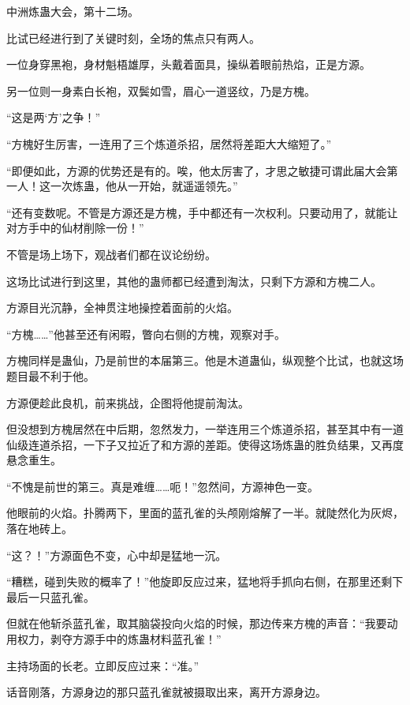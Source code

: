 
\begin{this_body}



中洲炼蛊大会，第十二场。

比试已经进行到了关键时刻，全场的焦点只有两人。

一位身穿黑袍，身材魁梧雄厚，头戴着面具，操纵着眼前热焰，正是方源。

另一位则一身素白长袍，双鬓如雪，眉心一道竖纹，乃是方槐。

“这是两‘方’之争！”

“方槐好生厉害，一连用了三个炼道杀招，居然将差距大大缩短了。”

“即便如此，方源的优势还是有的。唉，他太厉害了，才思之敏捷可谓此届大会第一人！这一次炼蛊，他从一开始，就遥遥领先。”

“还有变数呢。不管是方源还是方槐，手中都还有一次权利。只要动用了，就能让对方手中的仙材削除一份！”

不管是场上场下，观战者们都在议论纷纷。

这场比试进行到这里，其他的蛊师都已经遭到淘汰，只剩下方源和方槐二人。

方源目光沉静，全神贯注地操控着面前的火焰。

“方槐……”他甚至还有闲暇，瞥向右侧的方槐，观察对手。

方槐同样是蛊仙，乃是前世的本届第三。他是木道蛊仙，纵观整个比试，也就这场题目最不利于他。

方源便趁此良机，前来挑战，企图将他提前淘汰。

但没想到方槐居然在中后期，忽然发力，一举连用三个炼道杀招，甚至其中有一道仙级连道杀招，一下子又拉近了和方源的差距。使得这场炼蛊的胜负结果，又再度悬念重生。

“不愧是前世的第三。真是难缠……呃！”忽然间，方源神色一变。

他眼前的火焰。扑腾两下，里面的蓝孔雀的头颅刚熔解了一半。就陡然化为灰烬，落在地砖上。

“这？！”方源面色不变，心中却是猛地一沉。

“糟糕，碰到失败的概率了！”他旋即反应过来，猛地将手抓向右侧，在那里还剩下最后一只蓝孔雀。

但就在他斩杀蓝孔雀，取其脑袋投向火焰的时候，那边传来方槐的声音：“我要动用权力，剥夺方源手中的炼蛊材料蓝孔雀！”

主持场面的长老。立即反应过来：“准。”

话音刚落，方源身边的那只蓝孔雀就被摄取出来，离开方源身边。


\end{this_body}
